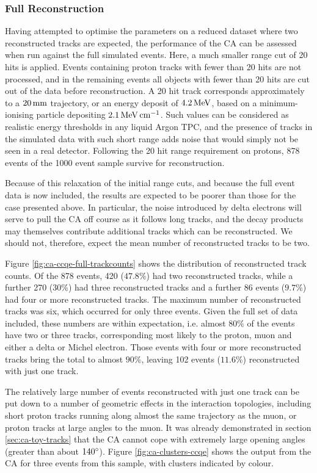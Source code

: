 \subsubsection{Full Reconstruction}
Having attempted to optimise the parameters on a reduced dataset where two reconstructed tracks are expected, the performance of the \ac{CA} can be assessed when run against the full simulated events. Here, a much smaller range cut of 20 hits is applied. Events containing proton tracks with fewer than 20 hits are not processed, and in the remaining events all objects with fewer than 20 hits are cut out of the data before reconstruction. A 20 hit track corresponds approximately to a $20\,\mathrm{mm}$ trajectory, or an energy deposit of $4.2\,\mathrm{MeV}$, based on a minimum-ionising particle depositing $2.1\,\mathrm{MeV} \,\mathrm{cm}^{-1}$. Such values can be considered as realistic energy thresholds in any liquid Argon TPC, and the presence of tracks in the simulated data with such short range adds noise that would simply not be seen in a real detector. Following the 20 hit range requirement on protons, 878 events of the 1000 event sample survive for reconstruction. 

Because of this relaxation of the initial range cuts, and because the full event data is now included, the results are expected to be poorer than those for the case presented above. In particular, the noise introduced by delta electrons will serve to pull the \ac{CA} off course as it follows long tracks, and the decay products may themselves contribute additional tracks which can be reconstructed. We should not, therefore, expect the mean number of reconstructed tracks to be two.

Figure \ref{fig:ca-ccqe-full-trackcounts} shows the distribution of reconstructed track counts. Of the 878 events, 420 ($47.8\%$) had two reconstructed tracks, while a further 270 ($30\%$) had three reconstructed tracks and a further 86 events ($9.7\%$) had four or more reconstructed tracks. The maximum number of reconstructed tracks was six, which occurred for only three events. Given the full set of data included, these numbers are within expectation, i.e. almost $80\%$ of the events have two or three tracks, corresponding most likely to the proton, muon and either a delta or Michel electron. Those events with four or more reconstructed tracks bring the total to almost $90\%$, leaving 102 events ($11.6\%$) reconstructed with just one track.

The relatively large number of events reconstructed with just one track can be put down to a number of geometric effects in the interaction topologies, including short proton tracks running along almost the same trajectory as the muon, or proton tracks at large angles to the muon. It was already demonstrated in section \ref{sec:ca-toy-tracks} that the \ac{CA} cannot cope with extremely large opening angles (greater than about $140^\circ$). Figure \ref{fig:ca-clusters-ccqe} shows the output from the CA for three events from this sample, with clusters indicated by colour.

